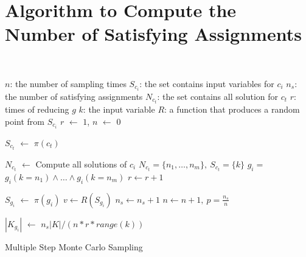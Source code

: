 \section{Algorithm to Compute the Number of Satisfying Assignments}
\label{appendix:montecarlo}
~
{\small
\IncMargin{1em}
\begin{algorithm}\small
    \SetAlgoLined
    \DontPrintSemicolon


    $n$: the number of sampling times \;
    $S_{c_i}$: the set contains input variables for $c_{i}$ \;
    $n_{s}$: the number of satisfying assignments \;
    $N_{c_t}$: the set contains all solution for $c_t$ \;
    $r$: times of reducing $g$\;
    $k$: the input variable \;
    $R$: a function that produces a random point from $S_{c_i}$\;
    $r$ $\leftarrow$ $1$,
    $n$ $\leftarrow$ $0$ \;
     {
        $S_{c_t}$ $\leftarrow$ $\pi(c_t)$ \;
        {
            $N_{c_t}$ $\leftarrow$ Compute all solutions of $c_i$ \;
            $N_{c_t} = \{n_1, \ldots, n_m\},\ S_{c_t} = \{k\}  $ \;
            $g_{i} = $ $g_i(k=n_1) \land \ldots \land g_i(k=n_m)$ \;
            $r \leftarrow r+1$ \;

        }
    }
     {
        $S_{g_i}$ $\leftarrow$ $\pi(g_i)$ \;
        $v \leftarrow R(S_{g_i})$ 
        {
           $n_s \leftarrow n_s + 1$
        }
        $n \leftarrow n +1,\ p = \frac{n_s}{n}$
    }

    $|K_{g_{i}}|$ $\leftarrow$ $n_s|K| / (n * r * range(k))$
    \caption{Multiple Step Monte Carlo Sampling}
\end{algorithm}
\DecMargin{1em}
}
~\vvv

